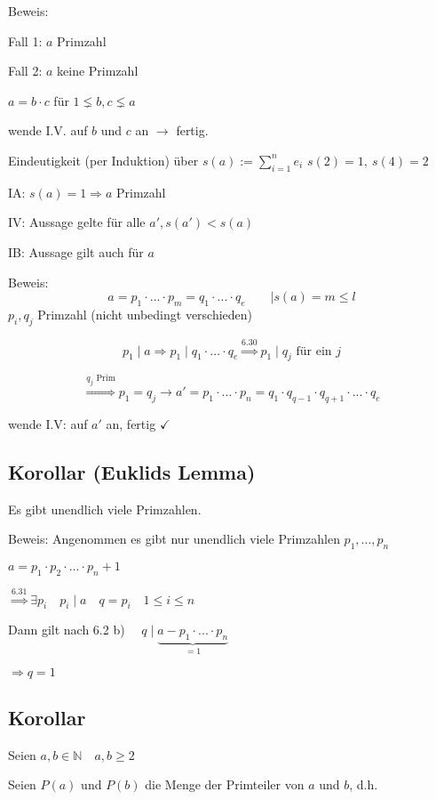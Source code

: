 \documentclass[a4paper, 12pt, twoside] {article}
\begin{document}
Beweis:

\qquad	Fall 1: $a$ Primzahl \checkmark
	
\qquad	Fall 2: $a$ keine Primzahl
	
\qquad	$a=b \cdot c$ für $1 \lneq b, c \lneq a$
	
\qquad	wende I.V. auf $b$ und $c$ an $\rightarrow$ fertig.
	
Eindeutigkeit (per Induktion) über $s(a) := \sum_{i=1}^{n} e_i$ \hfill $s(2) = 1, \ s(4) = 2$

IA:		$s(a) = 1 \Rightarrow a$ Primzahl \checkmark

IV:		Aussage gelte für alle $a', s(a') < s(a)$

IB:		Aussage gilt auch für $a$

Beweis:
$$a = p_1 \cdot ... \cdot p_m = q_1 \cdot ... \cdot q_e \qquad | s(a) = m \leq l$$
\hfill $p_i, q_j$ Primzahl (nicht unbedingt verschieden)

$$p_1 \mid a \Rightarrow p_1 \mid q_1 \cdot ... \cdot q_e \overset{6.30}{\Rightarrow} p_1 \mid q_j \text{ für ein } j$$

$$\overset{q_j \text{ Prim}}{\Rightarrow} p_1 = q_j \rightarrow a' = p_1 \cdot ... \cdot p_n = q_1 \cdot q_{q-1} \cdot q_{q+1} \cdot ... \cdot q_e$$

\qquad \qquad wende I.V: auf $a'$ an, fertig \hfill $\checkmark$

\subsection{Korollar (Euklids Lemma)} %

Es gibt unendlich viele Primzahlen.

Beweis:	Angenommen es gibt nur unendlich viele Primzahlen $p_1, ..., p_n$

$a = p_1 \cdot p_2 \cdot ... \cdot p_n + 1$

$\overset{6.31}{\Rightarrow} \exists p_i \quad p_i \mid a \quad q = p_i \quad 1 \leq i \leq n$
	
Dann gilt nach 6.2 b) $\quad q \mid \underbrace{a - p_1 \cdot ... \cdot p_n}_{=1}$

$\Rightarrow q = 1$ \Lightning

\subsection{Korollar} %

Seien $a,b \in \mathbb{N} \quad a,b \geq 2$

Seien $P(a)$ und $P(b)$ die Menge der Primteiler von $a$ und $b$, d.h.
\end{document}
